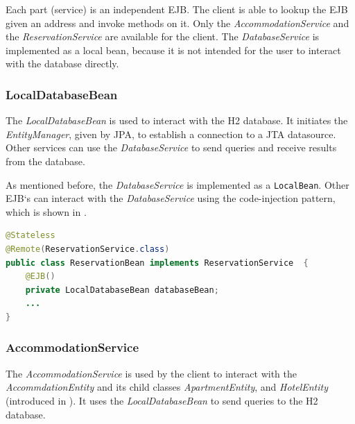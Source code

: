 Each part (service) is an independent EJB. The client is able to lookup the EJB given an address and invoke methods on it. Only the \textit{AccommodationService} and the \textit{ReservationService} are available for the client. The \textit{DatabaseService} is implemented as a local bean, because it is not intended for the user to interact with the database directly.


\subsubsection{LocalDatabaseBean}\label{sec:02_design_beans_local}
The \textit{LocalDatabaseBean} is used to interact with the H2 database. It initiates the \textit{EntityManager}, given by JPA, to establish a connection to a JTA datasource. Other services can use the \textit{DatabaseService} to send queries and receive results from the database.

As mentioned before, the \textit{DatabaseService} is implemented as a \texttt{LocalBean}. Other EJB`s can interact with the \textit{DatabaseService} using the code-injection pattern, which is shown in .
\begin{lstlisting}[label=lst:02_design_ejb_db_cinjection, caption=Usage of the \textit{LocalDatabaseBean} using code-injection, language=java]
@Stateless
@Remote(ReservationService.class)
public class ReservationBean implements ReservationService  {
    @EJB()
    private LocalDatabaseBean databaseBean;
    ...
}
\end{lstlisting}


\subsubsection{AccommodationService}\label{sec:02_design_beans_acc}
The \textit{AccommodationService} is used by the client to interact with the \textit{AccommdationEntity} and its child classes \textit{ApartmentEntity}, and \textit{HotelEntity} (introduced in ). It uses the \textit{LocalDatabaseBean} to send queries to the H2 database.

